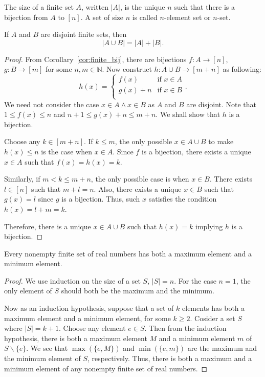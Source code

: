 \documentclass[../main.tex]{subfiles}
\begin{document}
\begin{defn}
    The \textsf{size} of a finite set $A$, written $|A|$, is the unique $n$ such that there is a bijection from $A$ to $[n]$.
    A set of size $n$ is called \textsf{$n$-element set} or \textsf{$n$-set}.
\end{defn}

\begin{cor} \label{cor:sum_disjoint}
    If $A$ and $B$ are disjoint finite sets, then
    \[
        |A \cup B| = |A| + |B|.
    \]
\end{cor}
\begin{proof}
    From Corollary~\ref{cor:finite_bij}, there are bijections $f: A \rightarrow [n]$, $g: B \rightarrow [m]$ for some $n, m \in \mathbb{N}$.
    Now construct $h: A \cup B \rightarrow [m + n]$ as following:
    \[
        h(x) = \begin{cases}
            f(x) &\text{if } x \in A\\
            g(x) + n &\text{if } x \in B\\
        \end{cases}.
    \]
    We need not consider the case $x \in A \wedge x \in B$ as $A$ and $B$ are disjoint.
    Note that $1 \leq f(x) \leq n$ and $n + 1 \leq g(x) + n \leq m + n$.
    We shall show that $h$ is a bijection.

    Choose any $k \in [m + n]$.
    If $k \leq m$, the only possible $x \in A \cup B$ to make $h(x) \leq n$ is the case when $x \in A$.
    Since $f$ is a bijection, there exists a unique $x \in A$ such that $f(x) = h(x) = k$.

    Similarly, if $m < k \leq m + n$, the only possible case is when $x \in B$.
    There exists $l \in [n]$ such that $m + l = n$.
    Also, there exists a unique $x \in B$ such that $g(x) = l$ since $g$ is a bijection.
    Thus, such $x$ satisfies the condition $h(x) = l + m = k$.

    Therefore, there is a unique $x \in A \cup B$ such that $h(x) = k$ implying $h$ is a bijection.
\end{proof}

\begin{cor}
    Every nonempty finite set of real numbers has both a maximum element and a minimum element.
\end{cor}
\begin{proof}
    We use induction on the size of a set $S$, $|S| = n$.
    For the case $n = 1$, the only element of $S$ should both be the maximum and the minimum.

    Now as an induction hypothesis, suppose that a set of $k$ elements has both a maximum element and a minimum element, for some $k \geq 2$.
    Cosider a set $S$ where $|S| = k + 1$.
    Choose any element $e \in S$.
    Then from the induction hypothesis, there is both a maximum element $M$ and a minimum element $m$ of $S \backslash \{e\}$.
    We see that $\max (\{e, M\})$ and $\min (\{e, m\})$ are the maximum and the minimum element of $S$, respectively.
    Thus, there is both a maximum and a minimum element of any nonempty finite set of real numbers.
\end{proof}
\end{document}
